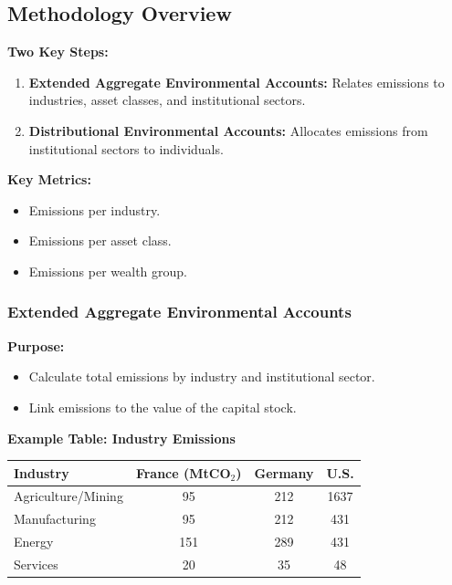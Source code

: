\documentclass[10pt]{beamer}
\begin{document}
\subsection{Methodology Overview}
\begin{frame}{\subsecname}
    \textbf{Two Key Steps:}
    \begin{enumerate}
        \item \textbf{Extended Aggregate Environmental Accounts:} Relates emissions to industries, asset classes, and institutional sectors.
        \item \textbf{Distributional Environmental Accounts:} Allocates emissions from institutional sectors to individuals.
    \end{enumerate}
    \vspace{0.3cm}
    \textbf{Key Metrics:}
    \begin{itemize}
        \item Emissions per industry.
        \item Emissions per asset class.
        \item Emissions per wealth group.
    \end{itemize}
\end{frame}

\subsubsection{Extended Aggregate Environmental Accounts}
\begin{frame}{\subsubsecname}
    \textbf{Purpose:}
    \begin{itemize}
        \item Calculate total emissions by industry and institutional sector.
        \item Link emissions to the value of the capital stock.
    \end{itemize}

    \textbf{Example Table: Industry Emissions}
    \begin{table}[]
        \centering
        \begin{tabular}{lccc}
        \toprule
        \textbf{Industry}        & \textbf{France (MtCO$_2$)} & \textbf{Germany} & \textbf{U.S.} \\
        \midrule
        Agriculture/Mining       & 95    & 212   & 1637  \\
        Manufacturing            & 95    & 212   & 431   \\
        Energy                   & 151   & 289   & 431   \\
        Services & 20    & 35    & 48    \\
        \bottomrule
        \end{tabular}
    \end{table}
\end{frame}
\end{document}
